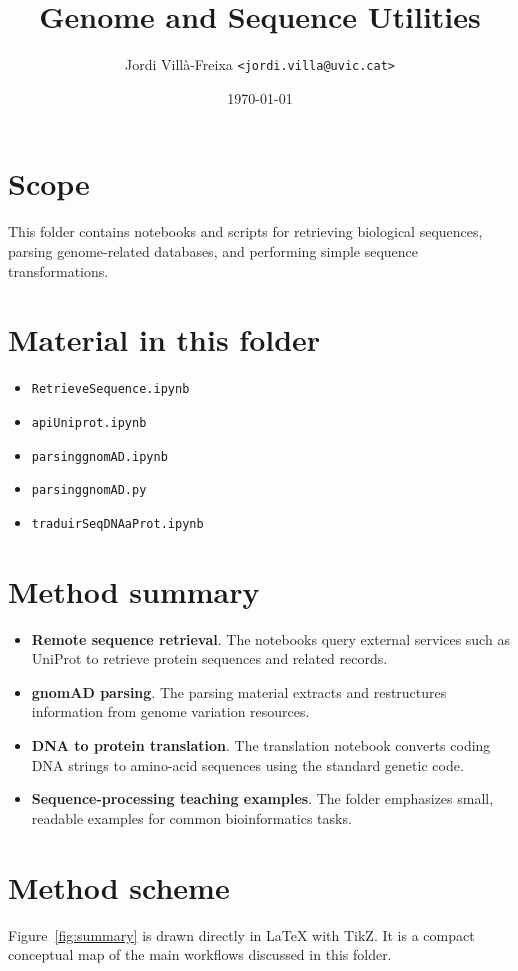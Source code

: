 \documentclass[11pt,a4paper]{article}
\title{Genome and Sequence Utilities}
\author{Jordi Vill\`a-Freixa \texttt{<jordi.villa@uvic.cat>}}
\date{\today}
\begin{document}
    \maketitle

    \section*{Scope}
    This folder contains notebooks and scripts for retrieving biological sequences, parsing genome-related databases, and performing simple sequence transformations.

    \section*{Material in this folder}
    \begin{itemize}[leftmargin=*]
\item \texttt{RetrieveSequence.ipynb}
\item \texttt{apiUniprot.ipynb}
\item \texttt{parsinggnomAD.ipynb}
\item \texttt{parsinggnomAD.py}
\item \texttt{traduirSeqDNAaProt.ipynb}
    \end{itemize}

    \section*{Method summary}
    \begin{itemize}[leftmargin=*]
\item \textbf{Remote sequence retrieval}. The notebooks query external services such as UniProt to retrieve protein sequences and related records.
\item \textbf{gnomAD parsing}. The parsing material extracts and restructures information from genome variation resources.
\item \textbf{DNA to protein translation}. The translation notebook converts coding DNA strings to amino-acid sequences using the standard genetic code.
\item \textbf{Sequence-processing teaching examples}. The folder emphasizes small, readable examples for common bioinformatics tasks.
    \end{itemize}

    \section*{Method scheme}
    Figure~\ref{fig:summary} is drawn directly in LaTeX with TikZ. It is a compact conceptual map of the main workflows discussed in this folder.
\end{document}
